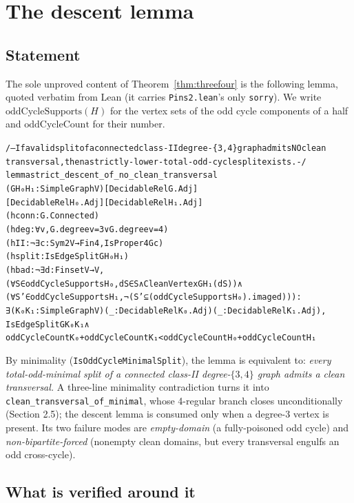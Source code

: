 \documentclass[11pt]{article}
\theoremstyle{definition}
\theoremstyle{remark}
\begin{document}
\section{The descent lemma}\label{5-the-descent-lemma}

\subsection{Statement}\label{51-statement}

The sole unproved content of Theorem~\ref{thm:threefour} is the following lemma, quoted verbatim from Lean (it carries \texttt{Pins2.lean}'s only \texttt{sorry}). We write $\mathrm{oddCycleSupports}(H)$ for the vertex sets of the odd cycle components of a half and $\mathrm{oddCycleCount}$ for their number.

{\small
\begin{alltt}
/-- If a valid split of a connected class-II degree-\{3,4\} graph admits NO clean
    transversal, then a strictly-lower-total-odd-cycle split exists. -/
lemma strict_descent_of_no_clean_transversal
    (G H₀ H₁ : SimpleGraph V) [DecidableRel G.Adj]
    [DecidableRel H₀.Adj] [DecidableRel H₁.Adj]
    (hconn : G.Connected)
    (hdeg : ∀ v, G.degree v = 3 ∨ G.degree v = 4)
    (hII : ¬ ∃ c : Sym2 V → Fin 4, IsProper4 G c)
    (hsplit : IsEdgeSplit G H₀ H₁)
    (hbad : ¬ ∃ d : Finset V → V,
        (∀ S ∈ oddCycleSupports H₀, d S ∈ S ∧ CleanVertex G H₁ (d S)) ∧
        (∀ S' ∈ oddCycleSupports H₁, ¬ (S' ⊆ (oddCycleSupports H₀).image d))) :
    ∃ (K₀ K₁ : SimpleGraph V) (_ : DecidableRel K₀.Adj) (_ : DecidableRel K₁.Adj),
      IsEdgeSplit G K₀ K₁ ∧
      oddCycleCount K₀ + oddCycleCount K₁ < oddCycleCount H₀ + oddCycleCount H₁
\end{alltt}
}

By minimality (\texttt{IsOddCycleMinimalSplit}), the lemma is equivalent to: \emph{every total-odd-minimal split of a connected class-II degree-$\{3,4\}$ graph admits a clean transversal.} A three-line minimality contradiction turns it into \texttt{clean\_transversal\_of\_minimal}, whose 4-regular branch closes unconditionally (Section 2.5); the descent lemma is consumed only when a degree-3 vertex is present. Its two failure modes are \emph{empty-domain} (a fully-poisoned odd cycle) and \emph{non-bipartite-forced} (nonempty clean domains, but every transversal engulfs an odd cross-cycle).

\subsection{What is verified around it}\label{52-around}
\end{document}
